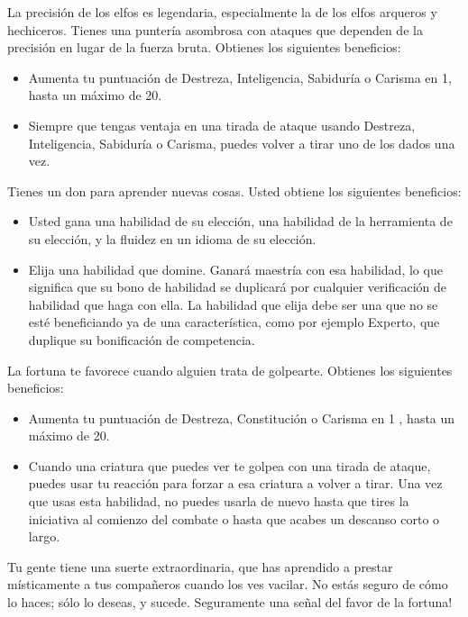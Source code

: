 \documentclass[a4paper,twocolumn,openany,10pt]{dndbook}
\begin{document}
La precisión de los elfos es legendaria, especialmente la de los elfos arqueros y hechiceros. Tienes una puntería asombrosa con
ataques que dependen de la precisión en lugar de la fuerza bruta. Obtienes los siguientes beneficios:
\begin{itemize}
\item Aumenta tu puntuación de Destreza, Inteligencia, Sabiduría o Carisma en 1, hasta un máximo de 20.
\item Siempre que tengas ventaja en una tirada de ataque usando Destreza, Inteligencia, Sabiduría o Carisma, puedes volver a
tirar uno de los dados una vez.
\end{itemize}

Tienes un don para aprender nuevas cosas. Usted obtiene los siguientes beneficios:
\begin{itemize}
\item Usted gana una habilidad de su elección, una habilidad de la herramienta de su elección, y la fluidez en un idioma de su
elección.
\item Elija una habilidad que domine. Ganará maestría con esa habilidad, lo que significa que su bono de habilidad se duplicará
por cualquier verificación de habilidad que haga con ella. La habilidad que elija debe ser una que no se esté beneficiando ya de
una característica, como por ejemplo Experto, que duplique su bonificación de competencia.
\end{itemize}

La fortuna te favorece cuando alguien trata de golpearte. Obtienes los siguientes beneficios:
\begin{itemize}
\item Aumenta tu puntuación de Destreza, Constitución o Carisma en 1 , hasta un máximo de 20.
\item Cuando una criatura que puedes ver te golpea con una tirada de ataque, puedes usar tu reacción para forzar a esa criatura
a volver a tirar. Una vez que usas esta habilidad, no puedes usarla de nuevo hasta que tires la iniciativa al comienzo del
combate o hasta que acabes un descanso corto o largo.
\end{itemize}

Tu gente tiene una suerte extraordinaria, que has aprendido a prestar místicamente a tus compañeros cuando los ves vacilar. No
estás seguro de cómo lo haces; sólo lo deseas, y sucede. Seguramente una señal del favor de la fortuna!
 
\end{document}
